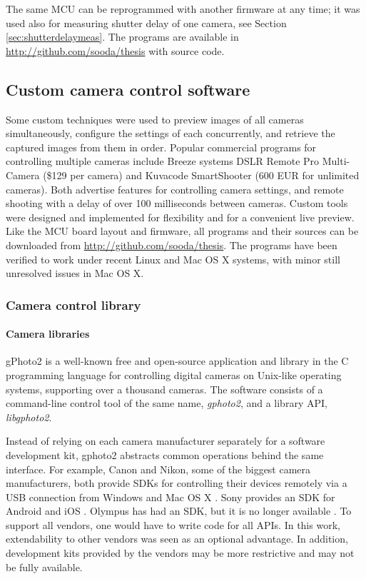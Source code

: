 The same MCU can be reprogrammed with another firmware at any time; it was used also for measuring shutter delay of one camera, see Section \ref{sec:shutterdelaymeas}.
The programs are available in \url {http://github.com/sooda/thesis} with source code.


\subsection{Custom camera control software} %

Some custom techniques were used to preview images of all cameras simultaneously, configure the settings of each concurrently, and retrieve the captured images from them in order.
Popular commercial programs for controlling multiple cameras include Breeze systems DSLR Remote Pro Multi-Camera \cite{breezesystemsmulti} (\$129 per camera) and Kuvacode SmartShooter \cite{smartshooter} (600 EUR for unlimited cameras).
Both advertise features for controlling camera settings, and remote shooting with a delay of over 100 milliseconds between cameras.
Custom tools were designed and implemented for flexibility and for a convenient live preview.
Like the MCU board layout and firmware, all programs and their sources can be downloaded from \url {http://github.com/sooda/thesis}.
The programs have been verified to work under recent Linux and Mac OS X systems, with minor still unresolved issues in Mac OS X.


\subsubsection{Camera control library} \label{sec:cameracontrollib} %

\paragraph{Camera libraries}
gPhoto2 \cite{gphoto2} is a well-known free and open-source application and library in the C programming language for controlling digital cameras on Unix-like operating systems, supporting over a thousand cameras.
The software consists of a command-line control tool of the same name, \emph{gphoto2}, and a library API, \emph{libgphoto2}.

Instead of relying on each camera manufacturer separately for a software development kit, gphoto2 abstracts common operations behind the same interface.
For example, Canon and Nikon, some of the biggest camera manufacturers, both provide SDKs for controlling their devices remotely via a USB connection from Windows and Mac OS X \cite{canonedsdk,nikonsdk}.
Sony provides an SDK for Android and iOS \cite{sonysdk}.
Olympus has had an SDK, but it is no longer available \cite{olympussdk}.
To support all vendors, one would have to write code for all APIs.
In this work, extendability to other vendors was seen as an optional advantage.
In addition, development kits provided by the vendors may be more restrictive and may not be fully available.

